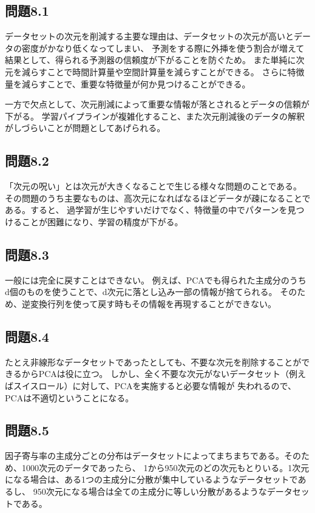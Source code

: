 \documentclass[a4j,twocolumn]{jsarticle}
\begin{document}
\subsection{問題8.1}
データセットの次元を削減する主要な理由は、データセットの次元が高いとデータの密度がかなり低くなってしまい、
予測をする際に外挿を使う割合が増えて結果として、得られる予測器の信頼度が下がることを防ぐため。
また単純に次元を減らすことで時間計算量や空間計算量を減らすことができる。
さらに特徴量を減らすことで、重要な特徴量が何か見つけることができる。

一方で欠点として、次元削減によって重要な情報が落とされるとデータの信頼が下がる。
学習パイプラインが複雑化すること、また次元削減後のデータの解釈がしづらいことが問題としてあげられる。

\subsection{問題8.2}
「次元の呪い」とは次元が大きくなることで生じる様々な問題のことである。
その問題のうち主要なものは、高次元になればなるほどデータが疎になることである。すると、
過学習が生じやすいだけでなく、特徴量の中でパターンを見つけることが困難になり、学習の精度が下がる。

\subsection{問題8.3}
一般には完全に戻すことはできない。
例えば、PCAでも得られた主成分のうちd個のものを使うことで、d次元に落とし込み一部の情報が捨てられる。
そのため、逆変換行列を使って戻す時もその情報を再現することができない。

\subsection{問題8.4}
たとえ非線形なデータセットであったとしても、不要な次元を削除することができるからPCAは役に立つ。
しかし、全く不要な次元がないデータセット（例えばスイスロール）に対して、PCAを実施すると必要な情報が
失われるので、PCAは不適切ということになる。

\subsection{問題8.5}
因子寄与率の主成分ごとの分布はデータセットによってまちまちである。そのため、1000次元のデータであったら、
1から950次元のどの次元もとりいる。1次元になる場合は、ある1つの主成分に分散が集中しているようなデータセットであるし、
950次元になる場合は全ての主成分に等しい分散があるようなデータセットである。
\end{document}
